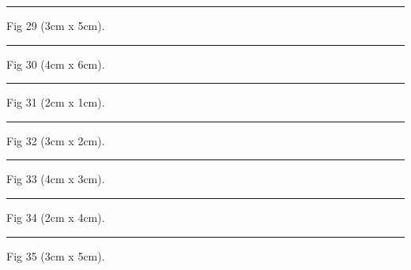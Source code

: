 \documentclass[a4paper,11pt]{article}
\begin{document}
\begin{swarmwrap}%
  \begin{minipage}[t]{3cm}
    \centering
    \rule{\linewidth}{5cm}
    {\footnotesize Fig 29 (3cm x 5cm).}
  \end{minipage}%
\end{swarmwrap}%
\swarmwrapnext
\lipsum[29]%

\begin{swarmwrap}%
  \begin{minipage}[t]{4cm}
    \centering
    \rule{\linewidth}{6cm}
    {\footnotesize Fig 30 (4cm x 6cm).}
  \end{minipage}%
\end{swarmwrap}%
\swarmwrapnext
\lipsum[30]%

\begin{swarmwrap}%
  \begin{minipage}[t]{2cm}
    \centering
    \rule{\linewidth}{1cm}
    {\footnotesize Fig 31 (2cm x 1cm).}
  \end{minipage}%
\end{swarmwrap}%
\swarmwrapnext
\lipsum[31]%

\begin{swarmwrap}%
  \begin{minipage}[t]{3cm}
    \centering
    \rule{\linewidth}{2cm}
    {\footnotesize Fig 32 (3cm x 2cm).}
  \end{minipage}%
\end{swarmwrap}%
\swarmwrapnext
\lipsum[32]%

\begin{swarmwrap}%
  \begin{minipage}[t]{4cm}
    \centering
    \rule{\linewidth}{3cm}
    {\footnotesize Fig 33 (4cm x 3cm).}
  \end{minipage}%
\end{swarmwrap}%
\swarmwrapnext
\lipsum[33]%

\begin{swarmwrap}%
  \begin{minipage}[t]{2cm}
    \centering
    \rule{\linewidth}{4cm}
    {\footnotesize Fig 34 (2cm x 4cm).}
  \end{minipage}%
\end{swarmwrap}%
\swarmwrapnext
\lipsum[34]%

\begin{swarmwrap}%
  \begin{minipage}[t]{3cm}
    \centering
    \rule{\linewidth}{5cm}
    {\footnotesize Fig 35 (3cm x 5cm).}
  \end{minipage}%
\end{swarmwrap}%
\swarmwrapnext
\lipsum[35]%
\end{document}
